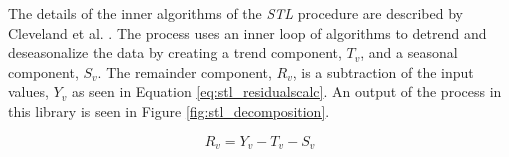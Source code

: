 The details of the inner algorithms of the \emph{STL} procedure are described by Cleveland et al. \cite{cleveland1990stl}. The process uses an inner loop of algorithms to detrend and deseasonalize the data by creating a trend component, $T_v$, and a seasonal component, $S_v$. The remainder component, $R_v$, is a subtraction of the input values, $Y_v$ as seen in Equation \ref{eq:stl_residualscalc}. An output of the process in this library is seen in Figure \ref{fig:stl_decomposition}. 

\begin{equation}
\label{eq:stl_residualscalc}
R_v = Y_v - T_v - S_v
\end{equation}

